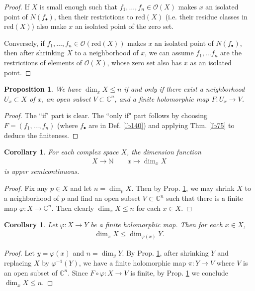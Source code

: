 \documentclass[12pt,b5paper,notitlepage]{report}
\theoremstyle{definition}
\theoremstyle{plain}
\newtheorem{pp}[df]{Proposition}
\newtheorem{co}[df]{Corollary}
\newcommand{\scr}{\mathscr}
\newcommand{\blt}{\bullet}
\newcommand{\Cbb}{\mathbb C}
\newcommand{\Nbb}{\mathbb N}
\newcommand{\red}{\mathrm{red}}
\numberwithin{equation}{section}
\begin{document}
\begin{proof}
If $X$ is small enough such that $f_1,\dots,f_n\in\scr O(X)$ makes $x$ an isolated point of $N(f_\blt)$, then their restrictions to $\red(X)$ (i.e. their residue classes in $\red(X)$) also make $x$ an isolated point of the zero set. 

Conversely, if $f_1,\dots,f_n\in\scr O(\red(X))$ makes $x$ an isolated point of $N(f_\blt)$, then after shrinking $X$ to a neighborhood of $x$, we can assume $f_1,\dots f_n$ are the restrictions of elements of $\scr O(X)$, whose zero set also has $x$ as an isolated point.
\end{proof}

\begin{pp}\label{lb141}
We have $\dim_xX\leq n$ if and only if there exist a neighborhood $U_x\subset X$ of $x$, an open subset $V\subset\Cbb^n$, and a finite holomorphic map $F:U_x\rightarrow V$.
\end{pp}

\begin{proof}
The ``if" part is clear. The ``only if" part follows by choosing $F=(f_1,\dots,f_n)$ (where $f_\blt$ are in Def. \ref{lb140}) and applying Thm. \ref{lb75} to deduce the finiteness.
\end{proof}

\begin{co}\label{lb153}
For each complex space $X$, the dimension function
\begin{align*}
X\rightarrow \Nbb\qquad x\mapsto\dim_xX
\end{align*}
is upper semicontinuous.
\end{co}


\begin{proof}
Fix any $p\in X$ and let $n=\dim_pX$. Then by Prop. \ref{lb141}, we may shrink $X$ to a neighborhood of $p$ and find an open subset $V\subset\Cbb^n$ such that there is a finite map $\varphi:X\rightarrow\Cbb^n$. Then clearly $\dim_xX\leq n$ for each $x\in X$.
\end{proof}

\begin{co}\label{lb143}
Let $\varphi:X\rightarrow Y$ be a finite holomorphic map. Then for each $x\in X$,
\begin{align}
\dim_x X\leq \dim_{\varphi(x)}Y.
\end{align}
\end{co}

\begin{proof}
Let $y=\varphi(x)$ and $n=\dim_yY$. By Prop. \ref{lb141}, after shrinking $Y$ and replacing $X$ by $\varphi^{-1}(Y)$, we have a finite holomorphic map $\pi:Y\rightarrow V$ where $V$ is an open subset of $\Cbb^n$. Since $F\circ\varphi:X\rightarrow V$ is finite, by Prop. \ref{lb141} we conclude $\dim_xX\leq n$.
\end{proof}
\end{document}
